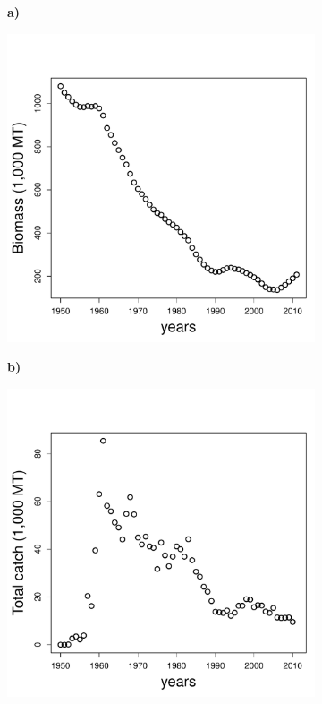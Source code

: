 \documentclass[]{elsarticle} %
\begin{document}
\begin{figure}[!htbp]
	\centering
	\begin{subfigure}[t]{0.02\textwidth}
		\textbf{a)}
	\end{subfigure}
	\begin{subfigure}[t]{0.3\textwidth}
		\includegraphics[width=\linewidth,valign=t]{TunaBiomass.pdf}
	\end{subfigure}	
	\begin{subfigure}[t]{0.02\textwidth}
		\textbf{b)}
	\end{subfigure}
	\begin{subfigure}[t]{0.3\textwidth}
		\includegraphics[width=\linewidth,valign=t]{TunaCatch.pdf}

\end{subfigure}
\end{figure}
\end{document}
